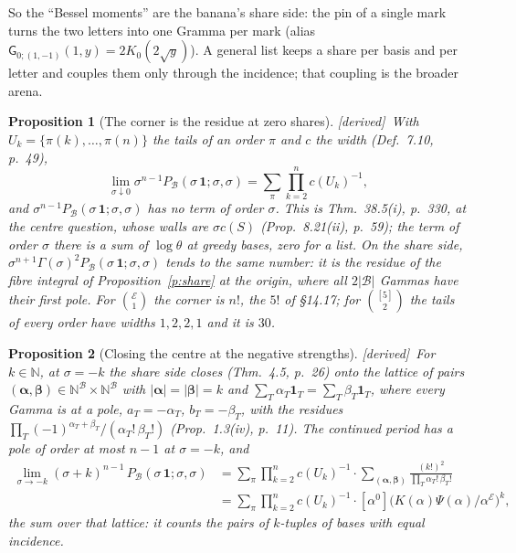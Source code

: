 \documentclass[11pt]{article}
\newcommand{\cE}{\mathcal E}
\newcommand{\cB}{\mathcal B}
\newcommand{\one}{\mathbf 1}
\newcommand{\sG}{\mathsf G}
\newcommand{\Pc}[1]{P_{\cB}(#1\,\one;#1,#1)}
\newcommand{\Clo}[1]{[\alpha^0]\big(K(\alpha)\Psi(\alpha)/\alpha^{\cE}\big)^{#1}}
\newcommand{\Cor}{\sum_\pi\prod_{k=2}^nc(U_k)^{-1}}
\theoremstyle{plain}
\newtheorem{proposition}{Proposition}[section]
\theoremstyle{definition}
\theoremstyle{remark}
\newcommand{\derived}{\textup{[derived]}}
\begin{document}
So the ``Bessel moments'' are the banana's share side: the pin of a single mark turns the two letters into one Gramma per mark (alias $\sG_{0;(1,-1)}(1,y)=2K_0(2\sqrt y)$). A general list keeps a share per basis and per letter and couples them only through the incidence; that coupling is the broader arena.

\begin{proposition}[The corner is the residue at zero shares]\label{p:corner}\derived\
With $U_k=\{\pi(k),\dots,\pi(n)\}$ the tails of an order $\pi$ and $c$ the width (Def.~7.10, p.~49),
\[
\lim_{\sigma\downarrow0}\sigma^{n-1}\Pc\sigma=\Cor ,
\]
and $\sigma^{n-1}\Pc\sigma$ has no term of order $\sigma$. This is Thm.~38.5(i), p.~330, at the centre question, whose walls are $\sigma c(S)$ (Prop.~8.21(ii), p.~59); the term of order $\sigma$ there is a sum of $\log\theta$ at greedy bases, zero for a list. On the share side, $\sigma^{n+1}\Gamma(\sigma)^2\Pc\sigma$ tends to the same number: it is the residue of the fibre integral of Proposition~\ref{p:share} at the origin, where all $2|\cB|$ Gammas have their first pole. For $\binom{\cE}1$ the corner is $n!$, the $5!$ of \S14.17; for $\binom{[5]}2$ the tails of every order have widths $1,2,2,1$ and it is $30$.
\end{proposition}

\begin{proposition}[Closing the centre at the negative strengths]\label{p:negcorner}\derived\
For $k\in\mathbb N$, at $\sigma=-k$ the share side closes (Thm.~4.5, p.~26) onto the lattice of pairs $(\boldsymbol\alpha,\boldsymbol\beta)\in\mathbb N^{\cB}\times\mathbb N^{\cB}$ with $|\boldsymbol\alpha|=|\boldsymbol\beta|=k$ and $\sum_T\alpha_T\one_T=\sum_T\beta_T\one_T$, where every Gamma is at a pole, $a_T=-\alpha_T$, $b_T=-\beta_T$, with the residues $\prod_T(-1)^{\alpha_T+\beta_T}/(\alpha_T!\,\beta_T!)$ (Prop.~1.3(iv), p.~11). The continued period has a pole of order at most $n-1$ at $\sigma=-k$, and
\begin{align*}
\lim_{\sigma\to-k}(\sigma+k)^{n-1}\,\Pc\sigma&=\Cor\cdot\sum_{(\boldsymbol\alpha,\boldsymbol\beta)}\frac{(k!)^2}{\prod_T\alpha_T!\,\beta_T!}\\
&=\Cor\cdot\Clo k ,
\end{align*}
the sum over that lattice: it counts the pairs of $k$-tuples of bases with equal incidence.
\end{proposition}
\end{document}
